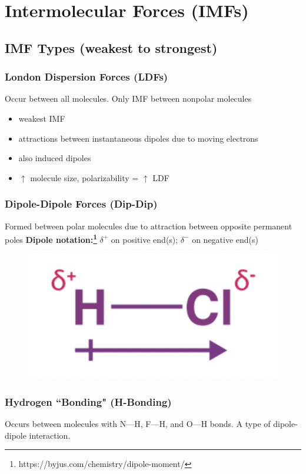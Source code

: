 \documentclass[a4paper, 12pt]{article}
\begin{document}
\section{Intermolecular Forces (IMFs)}

\subsection*{IMF Types (weakest to strongest)}

\subsubsection*{London Dispersion Forces (LDFs)}
Occur between all molecules. Only IMF between nonpolar molecules

\begin{itemize}[leftmargin=*, nosep]
    \item weakest IMF
    \item attractions between instantaneous dipoles due to moving electrons
    \item also induced dipoles
    \item $\uparrow$ molecule size, polarizability = $\uparrow$ LDF
\end{itemize}

\subsubsection*{Dipole-Dipole Forces (Dip-Dip)}
Formed between polar molecules due to attraction between opposite permanent poles
\textbf{Dipole notation:\footnote{https://byjus.com/chemistry/dipole-moment/}} $\delta^+$ on positive end(s); $\delta^-$ on negative end(s)

\begin{figure}[H]
    \centering
    \includegraphics[width=0.3\linewidth]{polarmol.png}
    \label{fig:ummmmmm}
\end{figure}

\subsubsection*{Hydrogen ``Bonding" (H-Bonding)}
Occurs between molecules with N---H, F---H, and O---H bonds. A type of dipole-dipole interaction.
\end{document}
